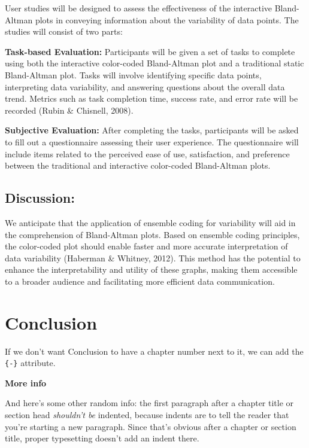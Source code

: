 \documentclass[print]{nuthesis}
\begin{document}
User studies will be designed to assess the effectiveness of the interactive Bland-Altman plots in conveying information about the variability of data points.
The studies will consist of two parts:

\textbf{Task-based Evaluation:} Participants will be given a set of tasks to complete using both the interactive color-coded Bland-Altman plot and a traditional static Bland-Altman plot.
Tasks will involve identifying specific data points, interpreting data variability, and answering questions about the overall data trend.
Metrics such as task completion time, success rate, and error rate will be recorded (Rubin \& Chisnell, 2008).

\textbf{Subjective Evaluation:} After completing the tasks, participants will be asked to fill out a questionnaire assessing their user experience.
The questionnaire will include items related to the perceived ease of use, satisfaction, and preference between the traditional and interactive color-coded Bland-Altman plots.

\hypertarget{discussion-1}{%
\section{Discussion:}\label{discussion-1}}

We anticipate that the application of ensemble coding for variability will aid in the comprehension of Bland-Altman plots.
Based on ensemble coding principles, the color-coded plot should enable faster and more accurate interpretation of data variability (Haberman \& Whitney, 2012).
This method has the potential to enhance the interpretability and utility of these graphs, making them accessible to a broader audience and facilitating more efficient data communication.

\hypertarget{conclusion-1}{%
\chapter*{Conclusion}\label{conclusion-1}}

If we don't want Conclusion to have a chapter number next to it, we can add the \texttt{\{-\}} attribute.

\textbf{More info}

And here's some other random info: the first paragraph after a chapter title or section head \emph{shouldn't be} indented, because indents are to tell the reader that you're starting a new paragraph. Since that's obvious after a chapter or section title, proper typesetting doesn't add an indent there.
\end{document}
